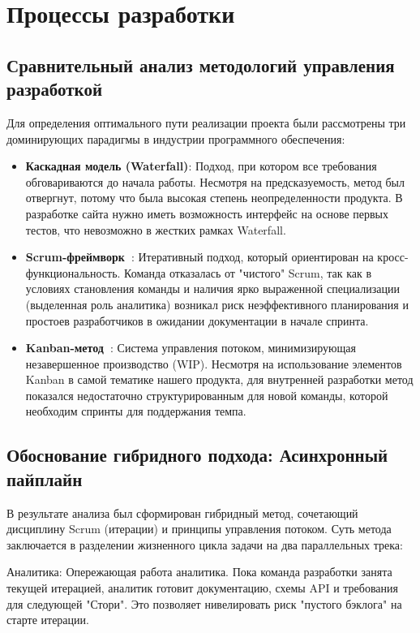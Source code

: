 \section{Процессы разработки}

\subsection{Сравнительный анализ методологий управления разработкой}

Для определения оптимального пути реализации проекта были рассмотрены три доминирующих парадигмы в индустрии программного обеспечения:
\begin{itemize}
    \item \textbf{Каскадная модель (Waterfall)}: Подход, при котором все требования обговариваются до начала работы. Несмотря на предсказуемость, метод был отвергнут, потому что была высокая степень неопределенности продукта. В разработке сайта нужно иметь возможность интерфейс на основе первых тестов, что невозможно в жестких рамках Waterfall.
    \item \textbf{Scrum-фреймворк~\cite{scrum-guide}}: Итеративный подход, который ориентирован на кросс-
    функциональность. 
    Команда отказалась от "чистого" Scrum, так как в условиях становления команды и наличия ярко выраженной специализации (выделенная роль аналитика) возникал риск неэффективного планирования и простоев разработчиков в ожидании документации в начале спринта.
    \item \textbf{Kanban-метод~\cite{kanban-book-and}}: Система управления потоком, минимизирующая незавершенное производство (WIP). Несмотря на использование элементов Kanban в самой тематике нашего продукта, для внутренней разработки метод показался недостаточно структурированным для новой команды, которой необходим спринты для поддержания темпа.
\end{itemize}

\subsection{Обоснование гибридного подхода: Асинхронный пайплайн}

В результате анализа был сформирован гибридный метод, сочетающий дисциплину Scrum (итерации) и принципы управления потоком. Суть метода заключается в разделении жизненного цикла задачи на два параллельных трека:

Аналитика: Опережающая работа аналитика. Пока команда разработки занята текущей итерацией, аналитик готовит документацию, схемы API и требования для следующей "Стори". Это позволяет нивелировать риск "пустого бэклога" на старте итерации.

